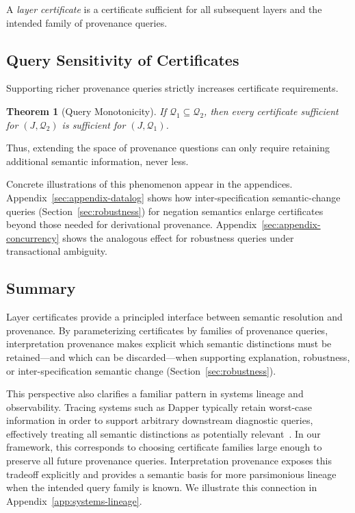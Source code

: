 \documentclass[acmsmall,nonacm]{acmart}
\newtheorem{theorem}{Theorem}
\theoremstyle{remark}
\numberwithin{definition}{section}
\numberwithin{theorem}{section}
\numberwithin{lemma}{section}
\numberwithin{corollary}{section}
\numberwithin{remark}{section}
\numberwithin{example}{section}
\numberwithin{observation}{section}
\numberwithin{assumption}{section}
\begin{document}
A \emph{layer certificate} is a certificate sufficient for all subsequent layers
and the intended family of provenance queries.

\subsection{Query Sensitivity of Certificates}

Supporting richer provenance queries strictly increases certificate requirements.

\begin{theorem}[Query Monotonicity]
If $\mathcal{Q}_1 \subseteq \mathcal{Q}_2$, then every certificate sufficient for
$(J,\mathcal{Q}_2)$ is sufficient for $(J,\mathcal{Q}_1)$.
\end{theorem}

\noindent
Thus, extending the space of provenance questions can only require retaining
additional semantic information, never less.

Concrete illustrations of this phenomenon appear in the appendices.
Appendix~\ref{sec:appendix-datalog} shows how inter-specification semantic-change queries
(Section~\ref{sec:robustness}) for negation semantics enlarge certificates beyond
those needed for derivational provenance.
Appendix~\ref{sec:appendix-concurrency} shows the analogous effect for robustness
queries under transactional ambiguity.

\subsection{Summary}

Layer certificates provide a principled interface between semantic resolution and
provenance.
By parameterizing certificates by families of provenance queries,
interpretation provenance makes explicit which semantic distinctions must be
retained—and which can be discarded—when supporting explanation, robustness, or
inter-specification semantic change (Section~\ref{sec:robustness}).

This perspective also clarifies a familiar pattern in systems lineage and
observability.
Tracing systems such as Dapper typically retain worst-case information in order to
support arbitrary downstream diagnostic queries, effectively treating all
semantic distinctions as potentially relevant~\cite{sigelman2010dapper}.
In our framework, this corresponds to choosing certificate families large enough
to preserve all future provenance queries.
Interpretation provenance exposes this tradeoff explicitly and provides a semantic
basis for more parsimonious lineage when the intended query family is known.
We illustrate this connection in Appendix~\ref{app:systems-lineage}.
\end{document}

